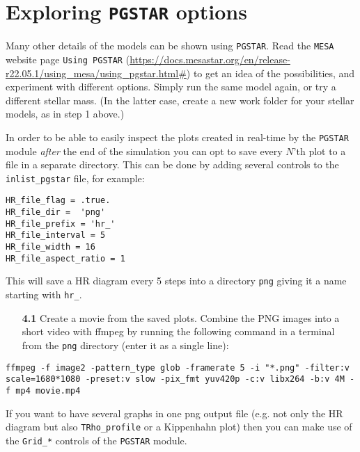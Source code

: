 \documentclass[11pt,a4paper]{article}
\newcommand{\MESA}{\texttt{MESA}\,}
\begin{document}
\section{Exploring \texttt{PGSTAR} options} 

Many other details of the models can be shown using \texttt{PGSTAR}. Read the \MESA website page \texttt{Using PGSTAR} (\url{https://docs.mesastar.org/en/release-r22.05.1/using_mesa/using_pgstar.html#}) to get an idea of the possibilities, and experiment with different options. Simply run the same model again, or try a different stellar mass. (In the latter case, create a new work folder for your stellar models, as in step 1 above.)

 In order to be able to easily inspect the plots created in
real-time by the \texttt{PGSTAR} module \emph{after} the end of the simulation you can
opt to save every $N$'th plot to a file in a separate directory. This can
be done by adding several controls to the \verb|inlist_pgstar| file, for
example:
\begin{lstlisting}
HR_file_flag = .true.
HR_file_dir =  'png'
HR_file_prefix = 'hr_'
HR_file_interval = 5
HR_file_width = 16
HR_file_aspect_ratio = 1
\end{lstlisting}

This will save a HR diagram every 5 steps into a directory \verb'png' giving
it a name starting with \verb"hr_".


\begin{enumerate}
  \item[\bf{4.1}] 
 Create a movie from the saved plots. Combine the PNG images into a short video with ffmpeg by running the following command in a terminal from the \verb'png' directory (enter it as a single line):
\end{enumerate}

\begin{lstlisting}
ffmpeg -f image2 -pattern_type glob -framerate 5 -i "*.png" -filter:v scale=1680*1080 -preset:v slow -pix_fmt yuv420p -c:v libx264 -b:v 4M -f mp4 movie.mp4
\end{lstlisting}



\begin{tcolorbox}[protipbox]
If you want to have several graphs in one png output file (e.g. not only the HR diagram but also \verb|TRho_profile| or a Kippenhahn plot) then you can make use of the \verb|Grid_*| controls of the \texttt{PGSTAR} module.
\end{tcolorbox}





\end{document}
